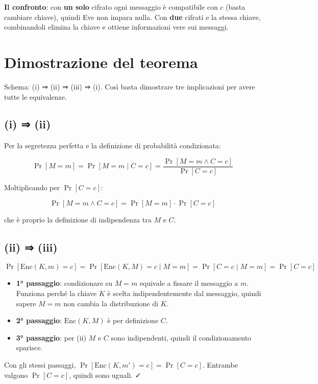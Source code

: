 \textbf{Il confronto}: con \textbf{un solo} cifrato ogni messaggio è compatibile con \(c\) (basta cambiare chiave), quindi Eve non impara nulla. Con \textbf{due} cifrati e la stessa chiave, combinandoli elimina la chiave e ottiene informazioni vere sui messaggi.

\section{Dimostrazione del teorema}

Schema: (i) ⇒ (ii) ⇒ (iii) ⇒ (i). Così basta dimostrare tre implicazioni per avere tutte le equivalenze.

\subsection{(i) ⇒ (ii)}

Per la segretezza perfetta e la definizione di probabilità condizionata:

\[
\Pr[M = m] = \Pr[M = m \mid C = c] = \frac{\Pr[M = m \wedge C = c]}{\Pr[C = c]}
\]

Moltiplicando per \(\Pr[C = c]\):

\[
\Pr[M = m \wedge C = c] = \Pr[M = m] \cdot \Pr[C = c]
\]

che è proprio la definizione di indipendenza tra \(M\) e \(C\).

\subsection{(ii) ⇒ (iii)}

\[
\Pr[\text{Enc}(K, m) = c] = \Pr[\text{Enc}(K, M) = c \mid M = m] = \Pr[C = c \mid M = m] = \Pr[C = c]
\]

\begin{itemize}
\tightlist
\item
  \textbf{1° passaggio}: condizionare su \(M = m\) equivale a fissare il messaggio a \(m\). Funziona perché la chiave \(K\) è scelta indipendentemente dal messaggio, quindi sapere \(M = m\) non cambia la distribuzione di \(K\).
\item
  \textbf{2° passaggio}: \(\text{Enc}(K, M)\) è per definizione \(C\).
\item
  \textbf{3° passaggio}: per (ii) \(M\) e \(C\) sono indipendenti, quindi il condizionamento sparisce.
\end{itemize}

Con gli stessi passaggi, \(\Pr[\text{Enc}(K, m') = c] = \Pr[C = c]\). Entrambe valgono \(\Pr[C = c]\), quindi sono uguali. ✓

